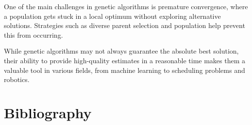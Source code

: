 \documentclass{article}
\begin{document}
One of the main challenges in genetic algorithms is premature convergence, where a population gets stuck in a local optimum without exploring alternative solutions. Strategies such as diverse parent selection and population help prevent this from occurring.

While genetic algorithms may not always guarantee the absolute best solution, their ability to provide high-quality estimates in a reasonable time makes them a valuable tool in various fields, from machine learning to scheduling problems and robotics.

\newpage
\section{Bibliography}
\end{document}
